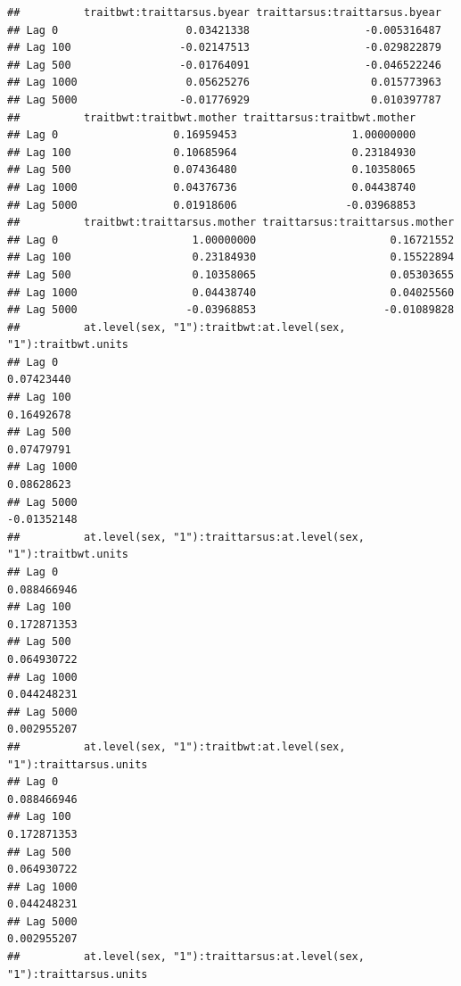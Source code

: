 \documentclass[
  12pt,
]{book}
\begin{document}
\begin{verbatim}
##          traitbwt:traittarsus.byear traittarsus:traittarsus.byear
## Lag 0                    0.03421338                  -0.005316487
## Lag 100                 -0.02147513                  -0.029822879
## Lag 500                 -0.01764091                  -0.046522246
## Lag 1000                 0.05625276                   0.015773963
## Lag 5000                -0.01776929                   0.010397787
##          traitbwt:traitbwt.mother traittarsus:traitbwt.mother
## Lag 0                  0.16959453                  1.00000000
## Lag 100                0.10685964                  0.23184930
## Lag 500                0.07436480                  0.10358065
## Lag 1000               0.04376736                  0.04438740
## Lag 5000               0.01918606                 -0.03968853
##          traitbwt:traittarsus.mother traittarsus:traittarsus.mother
## Lag 0                     1.00000000                     0.16721552
## Lag 100                   0.23184930                     0.15522894
## Lag 500                   0.10358065                     0.05303655
## Lag 1000                  0.04438740                     0.04025560
## Lag 5000                 -0.03968853                    -0.01089828
##          at.level(sex, "1"):traitbwt:at.level(sex, "1"):traitbwt.units
## Lag 0                                                       0.07423440
## Lag 100                                                     0.16492678
## Lag 500                                                     0.07479791
## Lag 1000                                                    0.08628623
## Lag 5000                                                   -0.01352148
##          at.level(sex, "1"):traittarsus:at.level(sex, "1"):traitbwt.units
## Lag 0                                                         0.088466946
## Lag 100                                                       0.172871353
## Lag 500                                                       0.064930722
## Lag 1000                                                      0.044248231
## Lag 5000                                                      0.002955207
##          at.level(sex, "1"):traitbwt:at.level(sex, "1"):traittarsus.units
## Lag 0                                                         0.088466946
## Lag 100                                                       0.172871353
## Lag 500                                                       0.064930722
## Lag 1000                                                      0.044248231
## Lag 5000                                                      0.002955207
##          at.level(sex, "1"):traittarsus:at.level(sex, "1"):traittarsus.units

\end{verbatim}
\end{document}
